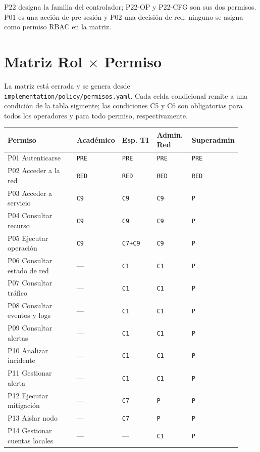 \documentclass[11pt,a4paper]{report}
\begin{document}
P22 designa la familia del controlador; P22-OP y P22-CFG son sus dos permisos. P01 es una acción de pre-sesión y P02 una decisión de red: ninguno se asigna como permiso RBAC en la matriz.

\section{Matriz Rol $\times$ Permiso}
La matriz está cerrada y se genera desde \texttt{implementation/policy/permisos.yaml}. Cada celda condicional remite a una condición de la tabla siguiente; las condiciones C5 y C6 son obligatorias para todos los operadores y para todo permiso, respectivamente.

\begingroup
\footnotesize
\begin{longtable}{p{0.30\linewidth}p{0.155\linewidth}p{0.155\linewidth}p{0.155\linewidth}p{0.155\linewidth}}
\toprule
Permiso & Académico & Esp. TI & Admin. Red & Superadmin\\
\midrule
P01 Autenticarse & \texttt{PRE} & \texttt{PRE} & \texttt{PRE} & \texttt{PRE}\\
P02 Acceder a la red & \texttt{RED} & \texttt{RED} & \texttt{RED} & \texttt{RED}\\
P03 Acceder a servicio & \texttt{C9} & \texttt{C9} & \texttt{C9} & \texttt{P}\\
P04 Consultar recurso & \texttt{C9} & \texttt{C9} & \texttt{C9} & \texttt{P}\\
P05 Ejecutar operación & \texttt{C9} & \texttt{C7+C9} & \texttt{C9} & \texttt{P}\\
P06 Consultar estado de red & --- & \texttt{C1} & \texttt{C1} & \texttt{P}\\
P07 Consultar tráfico & --- & \texttt{C1} & \texttt{C1} & \texttt{P}\\
P08 Consultar eventos y logs & --- & \texttt{C1} & \texttt{C1} & \texttt{P}\\
P09 Consultar alertas & --- & \texttt{C1} & \texttt{C1} & \texttt{P}\\
P10 Analizar incidente & --- & \texttt{C1} & \texttt{C1} & \texttt{P}\\
P11 Gestionar alerta & --- & \texttt{C1} & \texttt{C1} & \texttt{P}\\
P12 Ejecutar mitigación & --- & \texttt{C7} & \texttt{P} & \texttt{P}\\
P13 Aislar nodo & --- & \texttt{C7} & \texttt{P} & \texttt{P}\\
P14 Gestionar cuentas locales & --- & --- & \texttt{C1} & \texttt{P}\\

\end{longtable}
\end{document}
